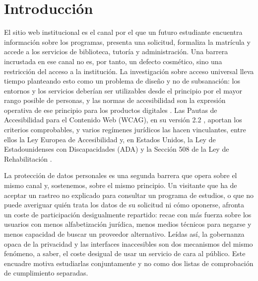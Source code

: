 \documentclass[pdflatex,sn-basic,Numbered,iicol]{sn-jnl}
\theoremstyle{thmstyleone}
\theoremstyle{thmstyletwo}
\theoremstyle{thmstylethree}
\begin{document}

\maketitle

\section{Introducci\'on}\label{sec:introduction}

El sitio web institucional es el canal por el que un futuro estudiante encuentra informaci\'on sobre los programas, presenta una solicitud, formaliza la matr\'icula y accede a los servicios de biblioteca, tutor\'ia y administraci\'on. Una barrera incrustada en ese canal no es, por tanto, un defecto cosm\'etico, sino una restricci\'on del acceso a la instituci\'on. La investigaci\'on sobre acceso universal lleva tiempo planteando esto como un problema de dise\~no y no de subsanaci\'on: los entornos y los servicios deber\'ian ser utilizables desde el principio por el mayor rango posible de personas, y las normas de accesibilidad son la expresi\'on operativa de ese principio para los productos digitales \citep{hermosaramirez2025universal}. Las Pautas de Accesibilidad para el Contenido Web (WCAG), en su versi\'on 2.2 \citep{wcag22}, aportan los criterios comprobables, y varios reg\'imenes jur\'idicos las hacen vinculantes, entre ellos la Ley Europea de Accesibilidad \citep{eaa2019} y, en Estados Unidos, la Ley de Estadounidenses con Discapacidades (ADA) y la Secci\'on 508 de la Ley de Rehabilitaci\'on \citep{ada1990,section508}.

La protecci\'on de datos personales es una segunda barrera que opera sobre el mismo canal y, sostenemos, sobre el mismo principio. Un visitante que ha de aceptar un rastreo no explicado para consultar un programa de estudios, o que no puede averiguar qui\'en trata los datos de su solicitud ni c\'omo oponerse, afronta un coste de participaci\'on desigualmente repartido: recae con m\'as fuerza sobre los usuarios con menos alfabetizaci\'on jur\'idica, menos medios t\'ecnicos para negarse y menos capacidad de buscar un proveedor alternativo. Le\'idas as\'i, la gobernanza opaca de la privacidad y las interfaces inaccesibles son dos mecanismos del mismo fen\'omeno, a saber, el coste desigual de usar un servicio de cara al p\'ublico. Este encuadre motiva estudiarlas conjuntamente y no como dos listas de comprobaci\'on de cumplimiento separadas.
\end{document}
